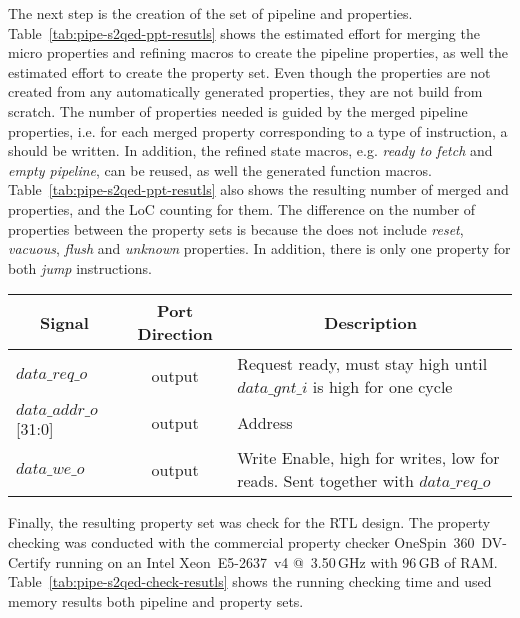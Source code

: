 The next step is the creation of the set of pipeline and \SSQED{} properties. Table~\ref{tab:pipe-s2qed-ppt-resutls} shows the estimated effort for merging the micro properties and refining macros to create the pipeline properties, as well the estimated effort to create the \SSQED{} property set. Even though the \SSQED{} properties are not created from any automatically generated properties, they are not build from scratch. The number of properties needed is guided by the merged pipeline properties, i.e. for each merged property corresponding to a type of instruction, a \SSQED{} should be written. In addition, the refined state macros, e.g. \textit{ready to fetch} and \textit{empty pipeline}, can be reused, as well the generated function macros. Table~\ref{tab:pipe-s2qed-ppt-resutls} also shows the resulting number of merged and \SSQED{} properties, and the LoC counting for them. The difference on the number of properties between the property sets is because the \SSQED{} does not include \textit{reset}, \textit{vacuous}, \textit{flush} and \textit{unknown} properties. In addition, there is only one \SSQED{} property for both \textit{jump} instructions. 

\begin{table*}[htb!] 
	\centering 
	\caption{LSU port signals of RI5CY processor\cite{manual-ri5cy}.} 
	\label{tab:pipe-s2qed-ppt-resutls}
	\begin{tabular}{l|c|p{7cm}} 
		\multicolumn{1}{c}{\bfseries Signal} & \multicolumn{1}{c}{\bfseries Port Direction} & \multicolumn{1}{c}{\bfseries Description} \\     
		\hline	
		$data\_req\_o$  &  output & Request ready, must stay high until $data\_gnt\_i$ is        high for one cycle \\
		\hline
		$data\_addr\_o$[31:0]  &  output & Address \\
		\hline
		$data\_we\_o$  &  output & Write Enable, high for writes, low for reads. Sent            together with $data\_req\_o$ \\
	\end{tabular} 
\end{table*}

Finally, the resulting property set was check for the RTL design. The property checking was conducted with the commercial property checker OneSpin~360~DV-Certify \texttrademark{} running on an Intel Xeon~E5-2637~v4  @~3.50\,GHz with 96\,GB of RAM. Table~\ref{tab:pipe-s2qed-check-resutls} shows the running checking time and used memory results both pipeline and \SSQED{} property sets.

